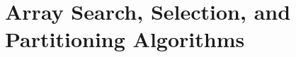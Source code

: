 \section{Array Search, Selection, and Partitioning Algorithms}%
\label{sec:fundamentals--array-search-sel-part-algorithms}





